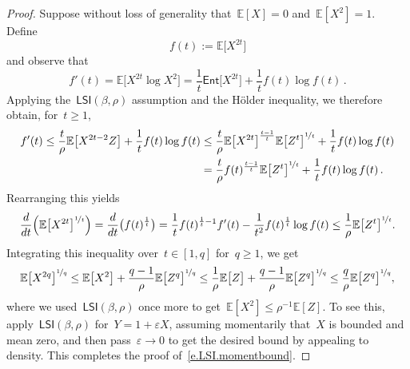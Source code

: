 \documentclass[11pt,twoside]{article} %
\numberwithin{equation}{section}
\theoremstyle{definition}
\newcommand{\eps}{\varepsilon}
\newcommand{\ep}{\eps}
\newcommand{\E}{\mathbb{E}}
\newcommand{\Ent}{\mathsf{Ent}}
\newcommand{\LSI}{\mathsf{LSI}}
\begin{document}
\begin{proof}
Suppose without loss of generality that~$\E[X]=0$ and~$\E[X^2] = 1$. 
Define
\begin{equation*}
f(t):= \E \bigl[ X^{2t} \bigr]
\end{equation*}
and observe that
\begin{equation*}
f'(t) =  \E \bigl[  X^{2t} \log X^2\bigr] = 
\frac1t \Ent\bigl[  X^{2t} \bigr]
+\frac1t f(t) \log f(t) \,.
\end{equation*}
Applying the~$\LSI(\beta,\rho)$ assumption and the H\"older inequality, we therefore obtain, for~$t \geq 1$, 
\begin{align}
\label{e.getmomentsLSI}
f'(t)
\leq
\frac{t}\rho \E\bigl[  X^{2t-2} Z \bigr]
+\frac1t f(t) \log f(t) 
& 
\leq 
\frac{t}\rho \E \bigl[  X^{2t} \bigr]^{\frac{t-1}{t}} \E \bigl[  Z^t \bigr]^{\nicefrac1t}  +\frac1t f(t) \log f(t) 
\notag \\ & 
= 
\frac{t}\rho f(t)^{\frac{t-1}{t}} \E \bigl[  Z^t \bigr]^{\nicefrac1t} +\frac1t f(t) \log f(t) \,.
\end{align}
Rearranging this yields
\begin{equation*}
\frac{d}{dt} \Bigl( \E \bigl[ X^{2t} \bigr]^{\nicefrac1t} \Bigr) 
=
\frac{d}{dt} \bigl( f(t)^{\frac1t} \bigr) 
=
\frac1t f(t)^{\frac1t-1} f'(t)
- \frac 1{t^2} f(t)^{\frac1t} \log f(t) 
\leq \frac1\rho\E \bigl[  Z^t \bigr]^{\nicefrac1t}.
\end{equation*}
Integrating this inequality over~$t\in [1,q]$ for~$q \geq 1$, we get
\begin{equation*}
\E \bigl[  X^{2q} \bigr]^{\nicefrac1q} 
\leq 
\E \bigl[  X^{2} \bigr] 
+ 
\frac{q-1}{\rho} \E \bigl[  Z^{q} \bigr]^{\nicefrac1q}
\leq 
\frac1\rho\E \bigl[  Z \bigr]
+
\frac{q-1}{\rho} \E \bigl[  Z^{q} \bigr]^{\nicefrac1q}
\leq 
\frac{q}{\rho} \E \bigl[  Z^{q} \bigr]^{\nicefrac1q},
\end{equation*}
where we used~$\LSI(\beta,\rho)$ once more to get~$\E[X^2]\leq \rho^{-1}\E[Z]$. To see this, apply~$\LSI(\beta,\rho)$ for~$Y=1 + \ep X$, assuming momentarily that~$X$ is bounded and mean zero, and then pass~$\ep \to 0$ to get the desired bound by appealing to density. This completes the proof of~\eqref{e.LSI.momentbound}. 

\smallskip


\end{proof}
\end{document}
